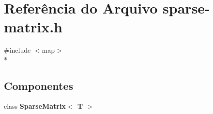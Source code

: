 \section{Referência do Arquivo sparse-\/matrix.h}
\label{sparse-matrix_8h}
{\ttfamily \#include $<$map$>$}\\*
\subsection*{Componentes}
\begin{DoxyCompactItemize}
\item 
class {\bf Sparse\+Matrix$<$ T $>$}
\end{DoxyCompactItemize}

